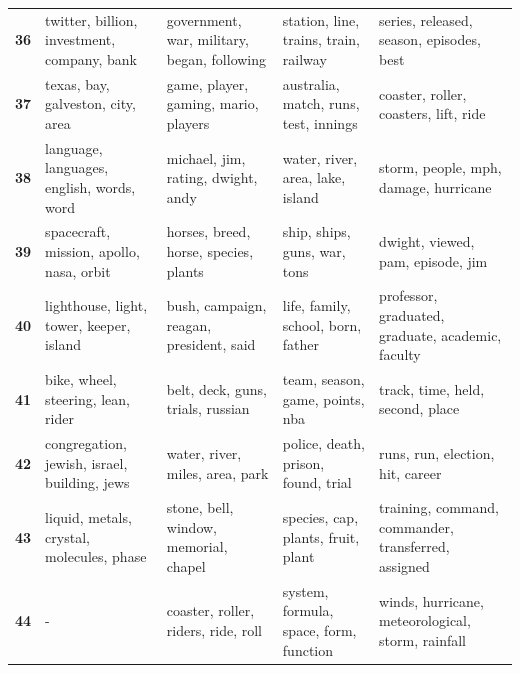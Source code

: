 \begin{xltabular}{\textwidth}{@{}l >{\RaggedRight\arraybackslash}X >{\RaggedRight\arraybackslash}X >{\RaggedRight\arraybackslash}X >{\RaggedRight\arraybackslash}X@{}}
    \textbf{36} & twitter, billion, investment, company, bank & government, war, military, began, following & station, line, trains, train, railway & series, released, season, episodes, best \\
    \textbf{37} & texas, bay, galveston, city, area & game, player, gaming, mario, players & australia, match, runs, test, innings & coaster, roller, coasters, lift, ride \\
    \textbf{38} & language, languages, english, words, word & michael, jim, rating, dwight, andy & water, river, area, lake, island & storm, people, mph, damage, hurricane \\
    \textbf{39} & spacecraft, mission, apollo, nasa, orbit & horses, breed, horse, species, plants & ship, ships, guns, war, tons & dwight, viewed, pam, episode, jim \\
    \textbf{40} & lighthouse, light, tower, keeper, island & bush, campaign, reagan, president, said & life, family, school, born, father & professor, graduated, graduate, academic, faculty \\
    \textbf{41} & bike, wheel, steering, lean, rider & belt, deck, guns, trials, russian & team, season, game, points, nba & track, time, held, second, place \\
    \textbf{42} & congregation, jewish, israel, building, jews & water, river, miles, area, park & police, death, prison, found, trial & runs, run, election, hit, career \\
    \textbf{43} & liquid, metals, crystal, molecules, phase & stone, bell, window, memorial, chapel & species, cap, plants, fruit, plant & training, command, commander, transferred, assigned \\
    \textbf{44} & - & coaster, roller, riders, ride, roll & system, formula, space, form, function & winds, hurricane, meteorological, storm, rainfall \\
\end{xltabular}
\endgroup
